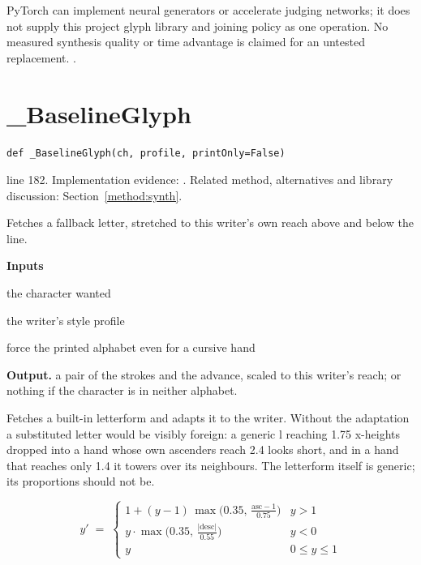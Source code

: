 PyTorch can implement neural generators or accelerate judging networks; it does not supply this project glyph library and joining policy as one operation. No measured synthesis quality or time advantage is claimed for an untested replacement. \cite{haines2016,gravesgenerate,ganwriting,onedm}.


\section{\_BaselineGlyph}\label{fn:synthesise:-BaselineGlyph}
\begin{lstlisting}[style=sig]
def _BaselineGlyph(ch, profile, printOnly=False)
\end{lstlisting}
 line 182. Implementation evidence: \cite{code2026}. Related method, alternatives and library discussion: Section~\ref{method:synth}.


Fetches a fallback letter, stretched to this writer's own reach above and below the line.




\noindent\textbf{Inputs}
\begin{description}[leftmargin=2.2em,style=nextline,font=\normalfont\ttfamily]\setlength\itemsep{1pt}
  \item[{ch}] \normalfont the character wanted
  \item[{profile}] \normalfont the writer's style profile
  \item[{printOnly}] \normalfont force the printed alphabet even for a cursive hand
\end{description}

\noindent\textbf{Output.} a pair of the strokes and the advance, scaled to this writer's reach; or nothing if the character is in neither alphabet.


Fetches a built-in letterform and adapts it to the writer. Without the adaptation a substituted letter would be visibly foreign: a generic l reaching 1.75 x-heights dropped into a hand whose own ascenders reach 2.4 looks short, and in a hand that reaches only 1.4 it towers over its neighbours. The letterform itself is generic; its proportions should not be.



\begin{equation}
y' \;=\; \begin{cases} 1 + (y-1)\,\max\!\big(0.35,\, \tfrac{\mathrm{asc}-1}{0.75}\big) & y > 1 \\[4pt] y \cdot \max\!\big(0.35,\, \tfrac{|\mathrm{desc}|}{0.55}\big) & y < 0 \\[4pt] y & 0 \le y \le 1 \end{cases}
\end{equation}

